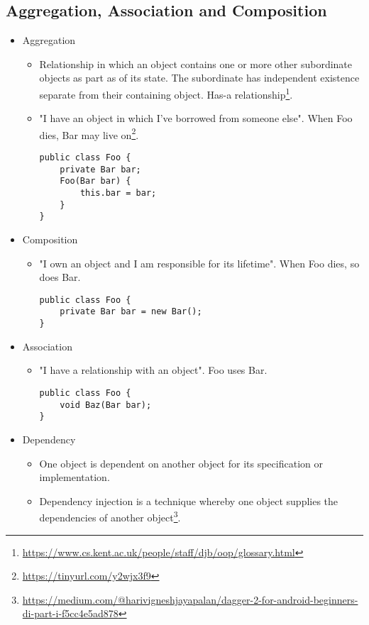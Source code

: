 \documentclass[a4paper, 11.25pt]{article}
\begin{document}
\subsection{Aggregation, Association and Composition}
\begin{itemize}
    \item Aggregation
    \begin{itemize}
        \item Relationship in which an object contains one or more other subordinate objects as part as of its state. The subordinate has independent existence separate from their containing object. Has-a relationship\footnote{\url{https://www.cs.kent.ac.uk/people/staff/djb/oop/glossary.html}}.
        \item "I have an object in which I've borrowed from someone else". When Foo dies, Bar may live on\footnote{\url{https://tinyurl.com/y2wjx3f9}}.
        \begin{lstlisting}[style=CStyle]
public class Foo {
    private Bar bar;
    Foo(Bar bar) {
        this.bar = bar;
    }
}\end{lstlisting}
    \end{itemize}
    \item Composition
    \begin{itemize}
        \item "I own an object and I am responsible for its lifetime". When Foo dies, so does Bar.
        \begin{lstlisting}[style=CStyle]
public class Foo {
    private Bar bar = new Bar();
}\end{lstlisting}
    \end{itemize}
    \item Association
    \begin{itemize}
        \item "I have a relationship with an object". Foo uses Bar.
        \begin{lstlisting}[style=CStyle]
public class Foo {
    void Baz(Bar bar);
}\end{lstlisting}
    \end{itemize}
    \item Dependency
    \begin{itemize}
        \item One object is dependent on another object for its specification or implementation.
        \item Dependency injection is a technique whereby one object supplies the dependencies of another object\footnote{\url{https://medium.com/@harivigneshjayapalan/dagger-2-for-android-beginners-di-part-i-f5cc4e5ad878}}.
    \end{itemize}
\end{itemize}
\end{document}
